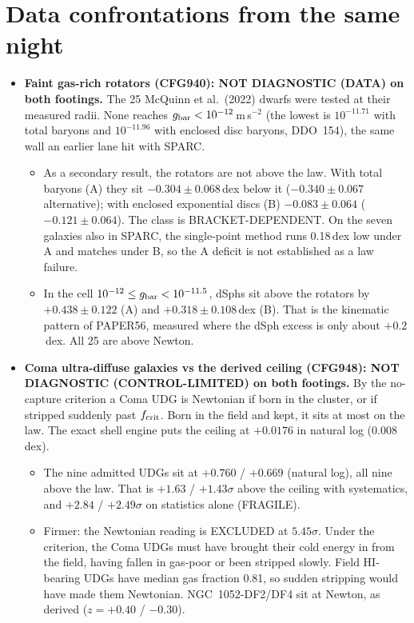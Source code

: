 \documentclass[10pt]{article}
\begin{document}
\section{Data confrontations from the same night}
\begin{itemize}
\item \textbf{Faint gas-rich rotators (CFG940): NOT DIAGNOSTIC (DATA) on both footings.} The 25 McQuinn et al.\ (2022) dwarfs were tested at their measured radii. None reaches $g_{\rm bar}<10^{-12}$\,m\,s$^{-2}$ (the lowest is $10^{-11.71}$ with total baryons and $10^{-11.96}$ with enclosed disc baryons, DDO~154), the same wall an earlier lane hit with SPARC.
  \begin{itemize}
  \item As a secondary result, the rotators are not above the law. With total baryons (A) they sit $-0.304\pm0.068$\,dex below it ($-0.340\pm0.067$ alternative); with enclosed exponential discs (B) $-0.083\pm0.064$ ($-0.121\pm0.064$). The class is BRACKET-DEPENDENT. On the seven galaxies also in SPARC, the single-point method runs 0.18\,dex low under A and matches under B, so the A deficit is not established as a law failure.
  \item In the cell $10^{-12}\le g_{\rm bar}<10^{-11.5}$, dSphs sit above the rotators by $+0.438\pm0.122$ (A) and $+0.318\pm0.108$\,dex (B). That is the kinematic pattern of PAPER56, measured where the dSph excess is only about $+0.2$\,dex. All 25 are above Newton.
  \end{itemize}
\item \textbf{Coma ultra-diffuse galaxies vs the derived ceiling (CFG948): NOT DIAGNOSTIC (CONTROL-LIMITED) on both footings.} By the no-capture criterion a Coma UDG is Newtonian if born in the cluster, or if stripped suddenly past $f_{\rm crit}$. Born in the field and kept, it sits at most on the law. The exact shell engine puts the ceiling at $+0.0176$ in natural log (0.008\,dex).
  \begin{itemize}
  \item The nine admitted UDGs sit at $+0.760$ / $+0.669$ (natural log), all nine above the law. That is $+1.63$ / $+1.43\sigma$ above the ceiling with systematics, and $+2.84$ / $+2.49\sigma$ on statistics alone (FRAGILE).
  \item Firmer: the Newtonian reading is EXCLUDED at $5.45\sigma$. Under the criterion, the Coma UDGs must have brought their cold energy in from the field, having fallen in gas-poor or been stripped slowly. Field HI-bearing UDGs have median gas fraction 0.81, so sudden stripping would have made them Newtonian. NGC~1052-DF2/DF4 sit at Newton, as derived ($z=+0.40$ / $-0.30$).

\end{itemize}
\end{itemize}
\end{document}
